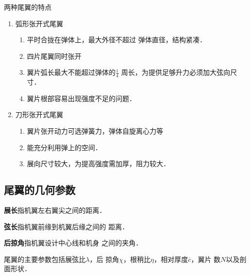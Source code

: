 \begin{notice}
两种尾翼的特点
\begin{enumerate}
  \item 弧形张开式尾翼
    \begin{enumerate}
      \item 平时合拢在弹体上，最大外径不超过
        弹体直径，结构紧凑．
      \item 四片尾翼同时张开
      \item 翼片弧长最大不能超过弹体的$\frac{1}{4}$
        周长，为提供足够升力必须加大弦向尺寸．
      \item 翼片根部容易出现强度不足的问题．
    \end{enumerate}
  \item 刀形张开式尾翼
    \begin{enumerate}
      \item 翼片张开动力可选弹簧力，弹体自旋离心力等
      \item 能充分利用弹上的空间．
      \item 展向尺寸较大，为提高强度需加厚，阻力较大．
    \end{enumerate}
\end{enumerate}
\end{notice}

\subsection{尾翼的几何参数}
{\bfseries 展长}指机翼左右翼尖之间的距离．

{\bfseries 弦长}指机翼前缘到机翼后缘之间的
距离．

{\bfseries 后掠角}指机翼设计中心线和机身
之间的夹角．

尾翼的主要参数包括{\color{blue}展弦比$\lambda$，后
掠角$\chi$，根稍比$\eta$，相对厚度$\overline{c}$，翼片
数$N$以及剖面形状}．

